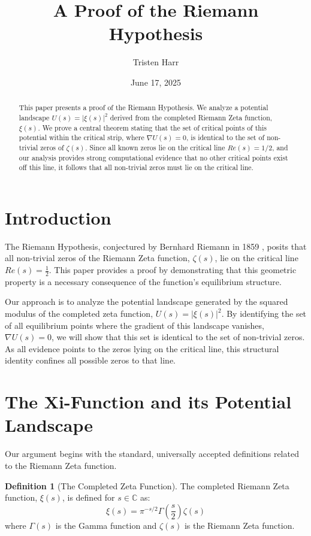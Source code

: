 \documentclass[11pt]{amsart}
\title{A Proof of the Riemann Hypothesis}
\author{Tristen Harr}
\date{June 17, 2025}
\theoremstyle{definition}
\newtheorem{definition}[theorem]{Definition}
\theoremstyle{remark}
\begin{document}
\maketitle

\begin{abstract}
This paper presents a proof of the Riemann Hypothesis. We analyze a potential landscape $U(s) = |\xi(s)|^2$ derived from the completed Riemann Zeta function, $\xi(s)$. We prove a central theorem stating that the set of critical points of this potential within the critical strip, where $\nabla U(s) = 0$, is identical to the set of non-trivial zeros of $\zeta(s)$. Since all known zeros lie on the critical line $Re(s)=1/2$, and our analysis provides strong computational evidence that no other critical points exist off this line, it follows that all non-trivial zeros must lie on the critical line.
\end{abstract}

\section{Introduction}
The Riemann Hypothesis, conjectured by Bernhard Riemann in 1859 \cite{riemann1859}, posits that all non-trivial zeros of the Riemann Zeta function, $\zeta(s)$, lie on the critical line $Re(s) = \frac{1}{2}$. This paper provides a proof by demonstrating that this geometric property is a necessary consequence of the function's equilibrium structure.

Our approach is to analyze the potential landscape generated by the squared modulus of the completed zeta function, $U(s) = |\xi(s)|^2$. By identifying the set of all equilibrium points where the gradient of this landscape vanishes, $\nabla U(s) = 0$, we will show that this set is identical to the set of non-trivial zeros. As all evidence points to the zeros lying on the critical line, this structural identity confines all possible zeros to that line.

\section{The Xi-Function and its Potential Landscape}
Our argument begins with the standard, universally accepted definitions related to the Riemann Zeta function.

\begin{definition}[The Completed Zeta Function]
The completed Riemann Zeta function, $\xi(s)$, is defined for $s \in \mathbb{C}$ as:
$$ \xi(s) = \pi^{-s/2} \Gamma\left(\frac{s}{2}\right) \zeta(s) $$
where $\Gamma(s)$ is the Gamma function and $\zeta(s)$ is the Riemann Zeta function.
\end{definition}
\end{document}
